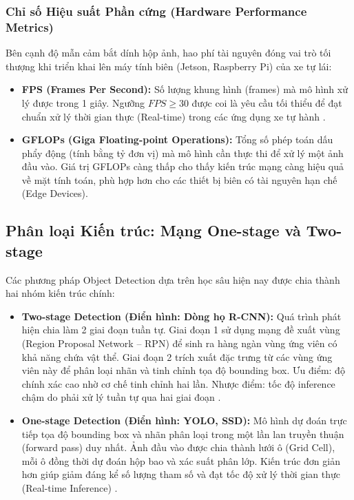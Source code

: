\documentclass[a4paper]{article}
\theoremstyle{definition}
\begin{document}
\subsubsection{Chỉ số Hiệu suất Phần cứng (Hardware Performance Metrics)}
Bên cạnh độ mẫn cảm bắt dính hộp ảnh, hao phí tài nguyên đóng vai trò tối thượng khi triển khai lên máy tính biên (Jetson, Raspberry Pi) của xe tự lái:
\begin{itemize}
	\item \textbf{FPS (Frames Per Second):} Số lượng khung hình (frames) mà mô hình xử lý được trong 1 giây. Ngưỡng $FPS \ge 30$ được coi là yêu cầu tối thiểu để đạt chuẩn xử lý thời gian thực (Real-time) trong các ứng dụng xe tự hành \cite{yolov8}.
	\item \textbf{GFLOPs (Giga Floating-point Operations):} Tổng số phép toán dấu phẩy động (tính bằng tỷ đơn vị) mà mô hình cần thực thi để xử lý một ảnh đầu vào. Giá trị GFLOPs càng thấp cho thấy kiến trúc mạng càng hiệu quả về mặt tính toán, phù hợp hơn cho các thiết bị biên có tài nguyên hạn chế (Edge Devices).
\end{itemize}

\subsection{Phân loại Kiến trúc: Mạng One-stage và Two-stage}
Các phương pháp Object Detection dựa trên học sâu hiện nay được chia thành hai nhóm kiến trúc chính:
\begin{itemize}
	\item \textbf{Two-stage Detection (Điển hình: Dòng họ R-CNN):} Quá trình phát hiện chia làm 2 giai đoạn tuần tự. Giai đoạn 1 sử dụng mạng đề xuất vùng (Region Proposal Network -- RPN) để sinh ra hàng ngàn vùng ứng viên có khả năng chứa vật thể. Giai đoạn 2 trích xuất đặc trưng từ các vùng ứng viên này để phân loại nhãn và tinh chỉnh tọa độ bounding box. Ưu điểm: độ chính xác cao nhờ cơ chế tinh chỉnh hai lần. Nhược điểm: tốc độ inference chậm do phải xử lý tuần tự qua hai giai đoạn \cite{faster-rcnn}.
	\item \textbf{One-stage Detection (Điển hình: YOLO, SSD):} Mô hình dự đoán trực tiếp tọa độ bounding box và nhãn phân loại trong một lần lan truyền thuận (forward pass) duy nhất. Ảnh đầu vào được chia thành lưới ô (Grid Cell), mỗi ô đồng thời dự đoán hộp bao và xác suất phân lớp. Kiến trúc đơn giản hơn giúp giảm đáng kể số lượng tham số và đạt tốc độ xử lý thời gian thực (Real-time Inference) \cite{yolov8}.
\end{itemize}
\end{document}
